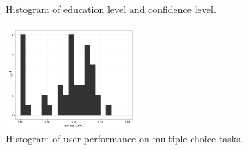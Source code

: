\documentclass[12pt]{article}
\begin{document}
\begin{figure}[ht!]
     \begin{center}
    \end{center}
    \caption{Histogram of education level and confidence level. }
\end{figure}


\begin{figure}[ht!]
\begin{center}
\includegraphics[width=0.45\textwidth]{../../output/demo_analysis/hist_user_perf_mc.png}
\caption{Histogram of user performance on multiple choice tasks.}
\end{center}	
\end{figure}
\end{document}
